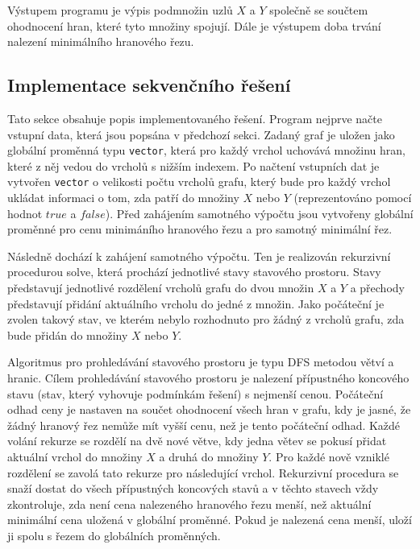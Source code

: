 \documentclass{article}
\begin{document}
Výstupem programu je výpis podmnožin uzlů $X$ a $Y$ společně se součtem ohodnocení hran, které tyto množiny spojují. Dále je výstupem doba trvání nalezení minimálního hranového řezu.

\subsection{Implementace sekvenčního řešení}
Tato sekce obsahuje popis implementovaného řešení. Program nejprve načte vstupní data, která jsou popsána v předchozí sekci. Zadaný graf je uložen jako globální proměnná typu \texttt{vector}, která pro každý vrchol uchovává množinu hran, které z něj vedou do vrcholů s nižším indexem. Po načtení vstupních dat je vytvořen \texttt{vector} o velikosti počtu vrcholů grafu, který bude pro každý vrchol ukládat informaci o tom, zda patří do množiny $X$ nebo $Y$ (reprezentováno pomocí hodnot $true$ a $false$). Před zahájením samotného výpočtu jsou vytvořeny globální proměnné pro cenu minimáního hranového řezu a pro samotný minimální řez.

Následně dochází k zahájení samotného výpočtu. Ten je realizován rekurzivní procedurou solve, která prochází jednotlivé stavy stavového prostoru. Stavy představují jednotlivé rozdělení vrcholů grafu do dvou množin $X$ a $Y$ a přechody představují přidání aktuálního vrcholu do jedné z množin. Jako počáteční je zvolen takový stav, ve kterém nebylo rozhodnuto pro žádný z vrcholů grafu, zda bude přidán do množiny $X$ nebo $Y$. 

Algoritmus pro prohledávání stavového prostoru je typu DFS metodou větví a hranic. Cílem prohledávání stavového prostoru je nalezení přípustného koncového stavu (stav, který vyhovuje podmínkám řešení) s nejmenší cenou. Počáteční odhad ceny je nastaven na součet ohodnocení všech hran v grafu, kdy je jasné, že žádný hranový řez nemůže mít vyšší cenu, než je tento počáteční odhad. Každé volání rekurze se rozdělí na dvě nové větve, kdy jedna větev se pokusí přidat aktuální vrchol do množiny $X$ a druhá do množiny $Y$. Pro každé nově vzniklé rozdělení se zavolá tato rekurze pro následující vrchol. Rekurzivní procedura se snaží dostat do všech přípustných koncových stavů a v těchto stavech vždy zkontroluje, zda není cena nalezeného hranového řezu menší, než aktuální minimální cena uložená v globální proměnné. Pokud je nalezená cena menší, uloží ji spolu s řezem do globálních proměnných.
\end{document}
